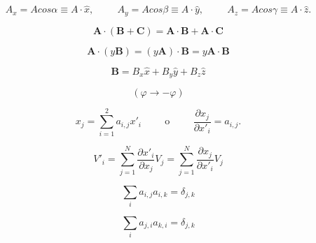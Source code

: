 \documentclass{article}
\begin{document}
	\begin{equation}
		A_x = A cos \alpha \equiv A \cdot \hat{x}, \hspace{1cm} A_y = 
		A cos \beta \equiv A \cdot \hat{y}, \hspace{1cm} A_z = 
		A cos \gamma \equiv A \cdot \hat{z}.
		\label{ec8}
	\end{equation}
	
	\begin{equation}
		\mathbf{A} \cdot (\mathbf{B} + \mathbf{C}) = 
		\mathbf{A} \cdot \mathbf{B}  + \mathbf{A}  \cdot \mathbf{C}
		\label{ec9}
	\end{equation}

	\begin{equation}
		\mathbf{A}    \cdot (y\mathbf{B}) = 
		(y\mathbf{A}) \cdot \mathbf{B} =
		 y\mathbf{A}  \cdot \mathbf{B}
		\label{ec10}
	\end{equation}

	\begin{equation}
		\mathbf{B} = B_x\hat{x} +  B_y\hat{y} + B_z\hat{z}
		\label{ec11}
	\end{equation}

	\begin{equation}
		(\varphi \rightarrow -\varphi)
		\label{ec12_1}
	\end{equation}

	\begin{equation}
		x_j = \sum_{i=1}^{2} a_{i,j} x'_i 
		\hspace{1cm} \text{o} \hspace{1cm} 
		\frac{\partial x_j}{\partial x'_i} = a_{i,j}.
		\label{ec12}
	\end{equation}

	\begin{equation}
		V'_i = 
		\sum_{j=1}^{N} \frac{\partial x'_i}{\partial x_j} V_j = 
		\sum_{j=1}^{N} \frac{\partial x_j}{\partial x'_i} V_j
		\label{ec13}
	\end{equation}

	\begin{equation}
		\sum_{i} a_{i,j} a_{i,k} = \delta_{j,k}
		\label{ec14}
	\end{equation}

	\begin{equation}
		\sum_{i} a_{j,i} a_{k,i} = \delta_{j,k}
		\label{ec15}
	\end{equation}
\end{document}
